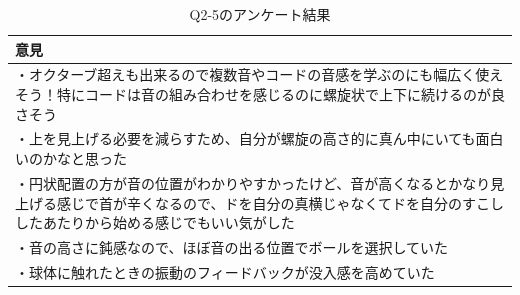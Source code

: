 \begin{table}[H]\centering 
    \caption{Q2-5のアンケート結果}\label{tab:Q2-5}
    \begin{tabular}{p{15cm}} \hline
    意見\\ \hline
    ・オクターブ超えも出来るので複数音やコードの音感を学ぶのにも幅広く使えそう！特にコードは音の組み合わせを感じるのに螺旋状で上下に続けるのが良さそう\\[2ex]
    ・上を見上げる必要を減らすため、自分が螺旋の高さ的に真ん中にいても面白いのかなと思った\\[2ex]
    ・円状配置の方が音の位置がわかりやすかったけど、音が高くなるとかなり見上げる感じで首が辛くなるので、ドを自分の真横じゃなくてドを自分のすこししたあたりから始める感じでもいい気がした\\[2ex]
    ・音の高さに鈍感なので、ほぼ音の出る位置でボールを選択していた \\[2ex]
    ・球体に触れたときの振動のフィードバックが没入感を高めていた\\ \hline
    \end{tabular}
\end{table}


